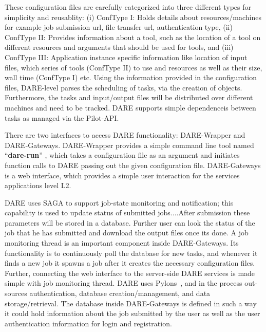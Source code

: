 \documentclass[]{svjour3}
\begin{document}
These configuration files are carefully categorized into three
different types for simplicity and reusablity: (i) ConfType I: Holds
details about resources/machines for example job submission url, file
transfer url, authentication type, (ii) ConfType II: Provides
information about a tool, such as the location of a tool on different
resources and arguments that should be used for tools, and (iii)
ConfType III: Application instance specific information like location
of input files, which series of tools (ConfType II) to use and
resources as well as their size, wall time (ConfType I) etc.  Using
the information provided in the configuration files, DARE-level parses
the scheduling of tasks, via the creation of objects.  Furthermore,
the tasks and input/output files will be distributed over different
machines and need to be tracked.  DARE supports simple dependenceis
between tasks as managed via the Pilot-API.




There are two interfaces to access DARE functionality: DARE-Wrapper
and DARE-Gateways.  DARE-Wrapper provides a simple command line tool
named ``\textbf{dare-run}'' , which takes a configuration file as an
argument and initiates function calls to DARE passing out the given
configuration file. DARE-Gateways is a web interface, which provides a
simple user interaction for the services applications level L2.

DARE uses SAGA to support job-state monitoring and notification; this
capability is used to update status of submitted jobs....After
submission these parameters will be stored in a database. Further user
can look the status of the job that he has submitted and download the
output files once its done.  A job monitoring thread is an important
component inside DARE-Gateways.  Its functionality is to continuously
poll the database for new tasks, and whenever it finds a new job it
spawns a job after it creates the necessary configuration files.
Further, connecting the web interface to the server-side DARE services
is made simple with job monitoring thread.  DARE uses
Pylons~\cite{pylons_website}, and in the process out-sources
authentication, database creation/management, and data
storage/retrieval.  The database inside DARE-Gateways is defined in
such a way it could hold information about the job submitted by the
user as well as the user authentication information for login and
registration.

\end{document}
